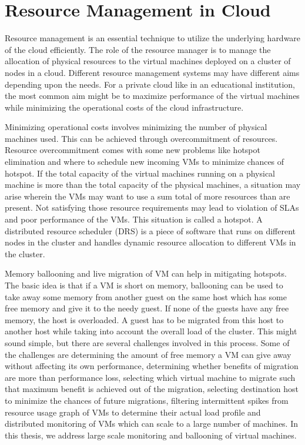 \section{Resource Management in Cloud}

Resource management is an essential technique to utilize the underlying hardware of the cloud efficiently. The role of the resource manager is to manage the allocation of physical resources to the virtual machines deployed on a cluster of nodes in a cloud. Different resource management systems may have different aims depending upon the needs. For a private cloud like in an educational institution, the most common aim might be to maximize performance of the virtual machines while minimizing the operational costs of the cloud infrastructure. 

Minimizing operational costs involves minimizing the number of physical machines used. This can be achieved through overcommitment of resources. Resource overcommitment comes with some new problems like hotspot elimination and where to schedule new incoming VMs to minimize chances of hotspot. If the total capacity of the virtual machines running on a physical machine is more than the total capacity of the physical machines, a situation may arise wherein the VMs may want to use a sum total of more resources than are present. Not satisfying those resource requirements may lead to violation of SLAs and poor performance of the VMs. This situation is called a hotspot. A distributed resource scheduler (DRS) is a piece of software that runs on different nodes in the cluster and handles dynamic resource allocation to different VMs in the cluster.

Memory ballooning and live migration of VM can help in mitigating hotspots. The basic idea is that if a VM is short on memory, ballooning can be used to take away some memory from another guest on the same host which has some free memory and give it to the needy guest. If none of the guests have any free memory, the host is overloaded. A guest has to be migrated from this host to another host while taking into account the overall load of the cluster. This might sound simple, but there are several challenges involved in this process. Some of the challenges are determining the amount of free memory a VM can give away without affecting its own performance, determining whether benefits of migration are more than performance loss, selecting which virtual machine to migrate such that maximum benefit is achieved out of the migration, selecting destination host to minimize the chances of future migrations, filtering intermittent spikes from resource usage graph of VMs to determine their actual load profile and distributed monitoring of VMs which can scale to a large number of machines. In this thesis, we address large scale monitoring and ballooning of virtual machines. 

